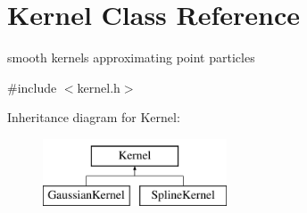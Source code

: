 \hypertarget{classKernel}{\section{\-Kernel \-Class \-Reference}
\label{classKernel}
}


smooth kernels approximating point particles  




{\ttfamily \#include $<$kernel.\-h$>$}

\-Inheritance diagram for \-Kernel\-:\begin{figure}[H]
\begin{center}
\leavevmode
\includegraphics[height=2.000000cm]{classKernel}
\end{center}
\end{figure}
